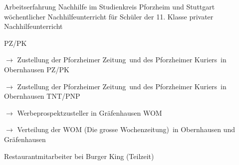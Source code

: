 \begin{rubric}{\textcolor{black!20!blue!100}{Arbeitserfahrung}}
		\entry*[10/2015 --- 01/2016]
			Nachhilfe im Studienkreis Pforzheim und Stuttgart
		\entry*[10/2011 --- 06/2012]
			wöchentlicher Nachhilfeunterricht für Schüler der 11. Klasse
		\entry*[\phantom{10/}2010 --- 2016]
			privater Nachhilfeunterricht
			
		\entry*[08/2015 --- 09/2015]
			PZ/PK
			
			\setlength{\hangindent}{\widthof{$\rightarrow$ }}
			$\rightarrow$ Zustellung der \glqq Pforzheimer Zeitung\grqq\ und des \glqq Pforzheimer Kuriers\grqq\ in Obernhausen
		\entry*[08/2012 --- 09/2012]
			PZ/PK
			
			\setlength{\hangindent}{\widthof{$\rightarrow$ }}
			$\rightarrow$ Zustellung der \glqq Pforzheimer Zeitung\grqq\ und des \glqq Pforzheimer Kuriers\grqq\ in Obernhausen
		\entry*[06/2009 --- 10/2010]
			TNT/PNP
			
			\setlength{\hangindent}{\widthof{$\rightarrow$ }}
			$\rightarrow$ Werbeprospektzusteller in Gräfenhausen
		\entry*[06/2007 --- 12/2008]
			WOM
			
			\setlength{\hangindent}{\widthof{$\rightarrow$ }}
			$\rightarrow$ Verteilung der \glqq WOM (Die grosse Wochenzeitung)\grqq\ in Obernhausen und Gräfenhausen
			
		\entry*[04/2012 --- 10/2012]
			Restaurantmitarbeiter bei Burger King (Teilzeit)
\end{rubric}